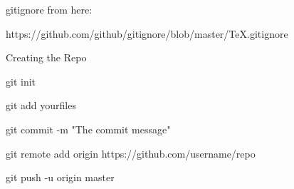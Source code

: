 \documentclass{article}
\begin{document}
gitignore from here:

https://github.com/github/gitignore/blob/master/TeX.gitignore

Creating the Repo

git init

git add yourfiles

git commit -m "The commit message"

git remote add origin https://github.com/username/repo

git push -u origin master
\end{document}

